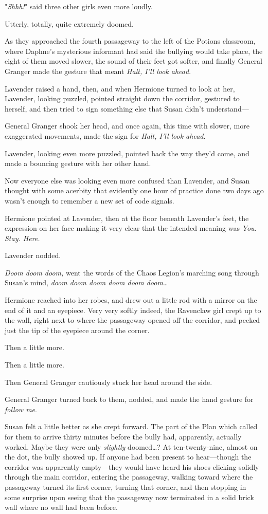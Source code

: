 "\emph{Shhh!}" said three other girls even more loudly.

Utterly, totally, quite extremely doomed.

As they approached the fourth passageway to the left of the Potions classroom,
where Daphne's mysterious informant had said the bullying would take place, the
eight of them moved slower, the sound of their feet got softer, and finally
General Granger made the gesture that meant \emph{Halt, I'll look ahead}.

Lavender raised a hand, then, and when Hermione turned to look at her,
Lavender, looking puzzled, pointed straight down the corridor, gestured to
herself, and then tried to sign something else that Susan didn't understand---

General Granger shook her head, and once again, this time with slower, more
exaggerated movements, made the sign for \emph{Halt, I'll look ahead}.

Lavender, looking even more puzzled, pointed back the way they'd come, and made
a bouncing gesture with her other hand.

Now everyone else was looking even more confused than Lavender, and Susan
thought with some acerbity that evidently one hour of practice done two days
ago wasn't enough to remember a new set of code signals.

Hermione pointed at Lavender, then at the floor beneath Lavender's feet, the
expression on her face making it very clear that the intended meaning was
\emph{You. Stay. Here.}

Lavender nodded.

\emph{Doom doom doom,} went the words of the Chaos Legion's marching song
through Susan's mind, \emph{doom doom doom doom doom doom}{\ldots}

Hermione reached into her robes, and drew out a little rod with a mirror on the
end of it and an eyepiece. Very very softly indeed, the Ravenclaw girl crept up
to the wall, right next to where the passageway opened off the corridor, and
peeked just the tip of the eyepiece around the corner.

Then a little more.

Then a little more.

Then General Granger cautiously stuck her head around the side.

General Granger turned back to them, nodded, and made the hand gesture for
\emph{follow me}.

Susan felt a little better as she crept forward. The part of the Plan which
called for them to arrive thirty minutes before the bully had, apparently,
actually worked. Maybe they were only \emph{slightly} doomed{\ldots}?
\later
At ten-twenty-nine, almost on the dot, the bully showed up. If anyone had been
present to hear---though the corridor was apparently empty---they would have
heard his shoes clicking solidly through the main corridor, entering the
passageway, walking toward where the passageway turned its first corner,
turning that corner, and then stopping in some surprise upon seeing that the
passageway now terminated in a solid brick wall where no wall had been before.

